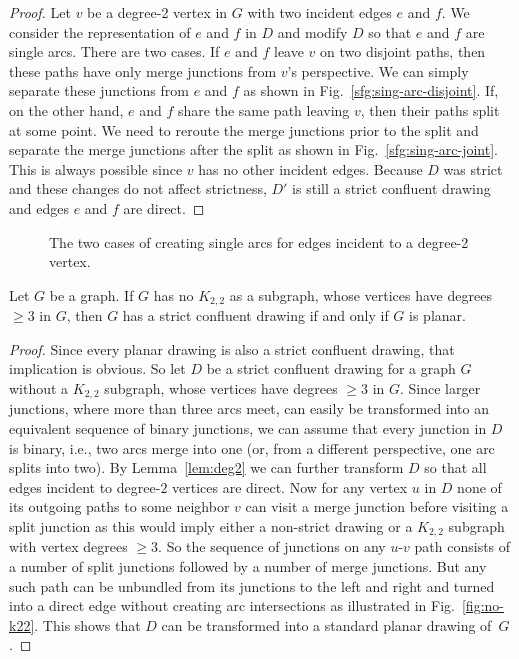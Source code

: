 \documentclass{llncs}
\begin{document}
\begin{proof}
  Let $v$ be a degree-2 vertex in $G$ with two incident edges $e$ and $f$. We consider the representation of $e$ and $f$ in $D$ and modify $D$ so that $e$ and $f$ are single arcs. There are two cases. If $e$ and $f$ leave $v$ on two disjoint paths, then these paths have only merge junctions from $v$'s perspective. We can simply separate these junctions from $e$ and $f$ as shown in Fig.~\ref{sfg:sing-arc-disjoint}. If, on the other hand, $e$ and $f$ share the same path leaving $v$, then their paths split at some point. We need to reroute the merge junctions prior to the split and separate the merge junctions after the split as shown in Fig.~\ref{sfg:sing-arc-joint}. This is always possible since $v$ has no other incident edges. Because $D$ was strict and these changes do not affect strictness, $D'$ is still a strict confluent drawing and edges $e$ and $f$ are direct.
\end{proof}

\begin{figure}[htbp]
  \centering
  \hfill  {}
  \caption{The two cases of creating single arcs for edges incident to a degree-2 vertex.}
  \label{fig:single-arc}
\end{figure}

\begin {lemma} \label {lem:k22}
  Let $G$ be a graph. If $G$ has no $K_{2,2}$ as a subgraph, whose vertices have degrees $\ge 3$ in $G$, then $G$ has a strict confluent drawing if and only if $G$ is planar.
\end {lemma}

\begin{proof}
  Since every planar drawing is also a strict confluent drawing, that implication is obvious.
	So let $D$ be a strict confluent drawing for a graph $G$ without a $K_{2,2}$ subgraph, whose vertices have degrees $\ge 3$ in $G$. Since larger junctions, where more than three arcs meet, can easily be transformed into an equivalent sequence of binary junctions, we can assume that every junction in $D$ is binary, i.e., two arcs merge into one (or, from a different perspective, one arc splits into two).
	By Lemma~\ref{lem:deg2} we can further transform $D$ so that all edges incident to degree-$2$ vertices are direct.
	Now for any vertex $u$ in $D$ none of its outgoing paths to some neighbor $v$ can visit a merge junction before visiting a split junction as this would imply either a non-strict drawing or a $K_{2,2}$ subgraph with vertex degrees $\ge 3$. So the sequence of junctions on any $u$-$v$ path consists of a number of split junctions followed by a number of merge junctions. But any such path can be unbundled from its junctions to the left and right and turned into a direct edge without creating arc intersections  as illustrated in Fig.~\ref{fig:no-k22}. This shows that $D$ can be transformed into a standard planar drawing of~$G$.
\end{proof}
\end{document}
